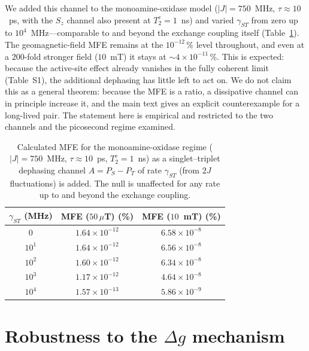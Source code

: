\documentclass[11pt]{article}
\begin{document}
We added this channel to the monoamine-oxidase model ($|J| = 750$~MHz,
$\tau\approx10$~ps, with the $S_z$ channel also present at $T_2^e = 1$~ns) and
varied $\gamma_{ST}$ from zero up to $10^{4}$~MHz---comparable to and beyond the
exchange coupling itself (Table~\ref{tab:stdeph}). The geomagnetic-field MFE
remains at the $10^{-12}\,\%$ level throughout, and even at a $200$-fold stronger field
($10$~mT) it stays at $\sim4\times10^{-11}\,\%$. This is expected: because the
active-site effect already vanishes in the fully coherent limit
(Table~S1), the additional dephasing has little left to act on. We do not claim
this as a general theorem: because the MFE is a ratio, a dissipative channel can
in principle increase it, and the main text gives an explicit counterexample for a
long-lived pair. The statement here is empirical and restricted to the two
channels and the picosecond regime examined.

\begin{table}[h]
\centering
\caption{Calculated MFE for the monoamine-oxidase regime ($|J| = 750$~MHz,
$\tau\approx10$~ps, $T_2^e = 1$~ns) as a singlet--triplet dephasing channel
$A = P_S - P_T$ of rate $\gamma_{ST}$ (from $2J$ fluctuations) is added. The null
is unaffected for any rate up to and beyond the exchange coupling.}
\label{tab:stdeph}
\begin{tabular}{c c c}
\toprule
$\gamma_{ST}$ (MHz) & MFE ($50\,\mu$T) (\%) & MFE ($10$~mT) (\%) \\
\midrule
0        & $1.64\times10^{-12}$ & $6.58\times10^{-8}$ \\
$10^{1}$ & $1.64\times10^{-12}$ & $6.56\times10^{-8}$ \\
$10^{2}$ & $1.60\times10^{-12}$ & $6.34\times10^{-8}$ \\
$10^{3}$ & $1.17\times10^{-12}$ & $4.64\times10^{-8}$ \\
$10^{4}$ & $1.57\times10^{-13}$ & $5.86\times10^{-9}$ \\
\bottomrule
\end{tabular}
\end{table}

\section{Robustness to the $\Delta g$ mechanism}
\end{document}
